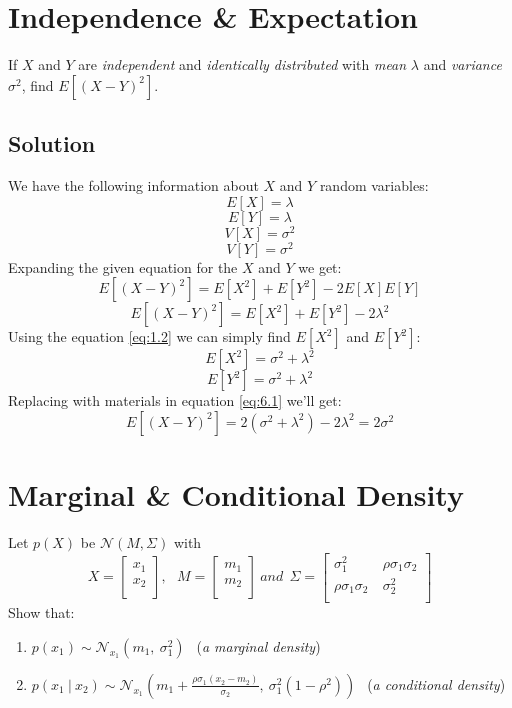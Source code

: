\documentclass[12pt]{article}
\numberwithin{equation}{section}
\numberwithin{table}{section}
\numberwithin{figure}{section}
\begin{document}
\section{Independence \& Expectation}
If $X$ and $Y$ are \textit{independent} and \textit{identically distributed} with \textit{mean} $\lambda$ and \textit{variance} $\sigma^2$, find $E[(X-Y)^2]$.

\subsection*{Solution}
We have the following information about $X$ and $Y$ random variables:\\
$$
	E[X] = \lambda
$$
$$
	E[Y] = \lambda
$$
$$
	V[X] = \sigma^2
$$
$$
	V[Y] = \sigma^2
$$
Expanding the given equation for the $X$ and $Y$ we get:
$$
	E[(X-Y)^2] = E[X^2] + E[Y^2] - 2E[X]E[Y]
$$	
\begin{equation}\label{eq:6.1}
E[(X-Y)^2] = E[X^2] + E[Y^2] - 2\lambda^2
\end{equation}
Using the equation \ref{eq:1.2} we can simply find $E[X^2]$ and $E[Y^2]$:
$$
	E[X^2] = \sigma^2 + \lambda^2
$$
$$
	E[Y^2] = \sigma^2 + \lambda^2
$$
Replacing with materials in equation \ref{eq:6.1} we'll get:
$$
	\boxed{E[(X-Y)^2] = 2(\sigma^2 + \lambda^2)- 2\lambda^2 = 2\sigma^2}	
$$
\section{Marginal \& Conditional Density}
Let $p(X)$ be $\mathcal{N}(M, \Sigma)$ with
$$
	X = \begin{bmatrix}
	x_1\\	
	x_2\\
	\end{bmatrix},\ \ \ 
	M = \begin{bmatrix}
	m_1\\	
	m_2\\
	\end{bmatrix}\ and\ \ 
	\Sigma = \begin{bmatrix}
	\sigma_1^2 & \rho\sigma_1\sigma_2\\	
	\rho\sigma_1\sigma_2\ & \sigma_2^2\\
	\end{bmatrix}
$$
Show that:
\begin{enumerate}[label=(\alph*)]
	\item $p(x_1) \sim \mathcal{N}_{x_1}(m_1,\ \sigma_1^2)\ \ $  (\textit{a marginal density})
	\item $p(x_1\ |\ x_2) \sim \mathcal{N}_{x_1}(m_1 + \frac{\rho\sigma_1(x_2 - m_2)}{\sigma_2},\ \sigma_1^2(1-\rho^2))\ \ $ (\textit{a conditional density})
\end{enumerate}
\end{document}
